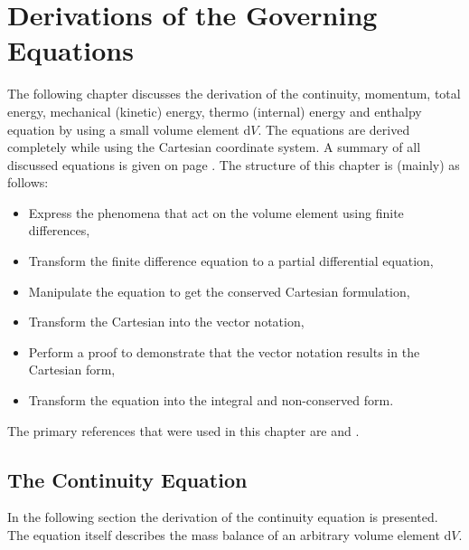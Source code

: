 %
%
\chapter{Derivations of the Governing Equations}
%
%
%
      The following chapter discusses the derivation of the continuity,
      momentum, total energy,  mechanical (kinetic) energy, thermo (internal)
      energy and enthalpy equation by using a small volume element d$V$. The
      equations are derived completely while using the Cartesian coordinate
      system. A summary of all discussed equations is given on page
      \pageref{SummationOfEquations}. The structure of this chapter is (mainly)
      as follows:
%
%
\begin{itemize}
 \item Express the phenomena that act on the volume element using finite differences,
 \item Transform the finite difference equation to a partial differential equation,
 \item Manipulate the equation to get the conserved Cartesian formulation,
 \item Transform the Cartesian into the vector notation,
 \item Perform a proof to demonstrate that the vector notation results in the Cartesian form,
 \item Transform the equation into the integral and non-conserved form.
\end{itemize}
%
%

	The primary references that were used in this chapter are
    \cite{  Bird, Versteeg, JasakPhD, Ferziger, Rappaz,  Schwarze, ProgrammersGuide}
    and \cite{Moukalled15}.
%
%
%
%
%
\section{The Continuity Equation}
%
%
	In the following section the derivation of the continuity equation is
    presented. The equation itself describes the mass balance of an arbitrary
    volume element d$V$.

